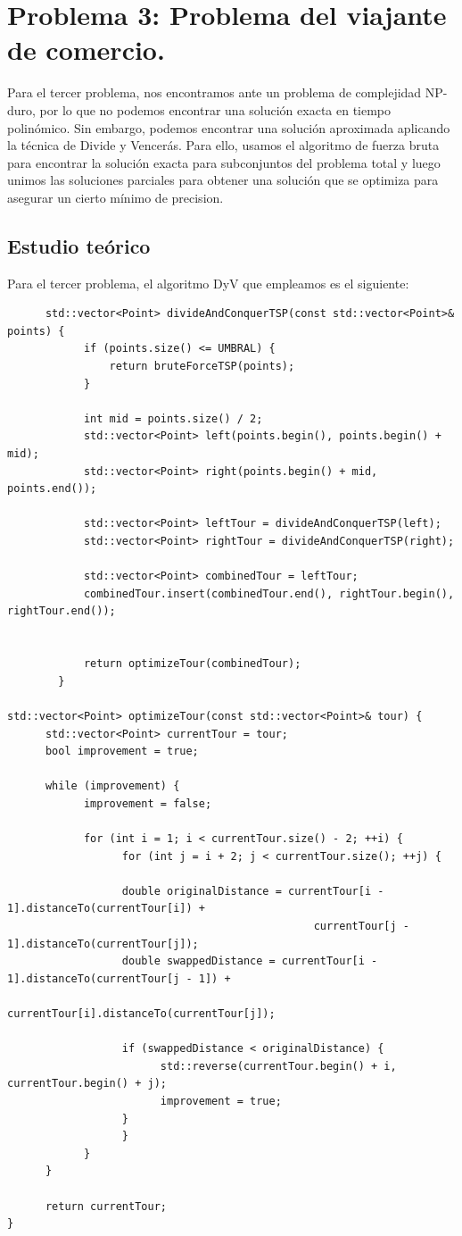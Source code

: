 \documentclass[11pt,openany]{book}
\begin{document}
\section{Problema 3: Problema del viajante de comercio.}
Para el tercer problema, nos encontramos ante un problema de complejidad
NP-duro, por lo que no podemos encontrar una solución exacta en tiempo polinómico.
Sin embargo, podemos encontrar una solución aproximada aplicando la técnica de Divide y Vencerás.
Para ello, usamos el algoritmo de fuerza bruta para encontrar la solución exacta para subconjuntos
del problema total y luego unimos las soluciones parciales para obtener una solución que se optimiza
para asegurar un cierto mínimo de precision.

\subsection{Estudio teórico}
Para el tercer problema, el algoritmo DyV que empleamos es el siguiente:
\begin{lstlisting}
      std::vector<Point> divideAndConquerTSP(const std::vector<Point>& points) {
            if (points.size() <= UMBRAL) {
                return bruteForceTSP(points);
            }
        
            int mid = points.size() / 2;
            std::vector<Point> left(points.begin(), points.begin() + mid);
            std::vector<Point> right(points.begin() + mid, points.end());
        
            std::vector<Point> leftTour = divideAndConquerTSP(left);
            std::vector<Point> rightTour = divideAndConquerTSP(right);
        
            std::vector<Point> combinedTour = leftTour;
            combinedTour.insert(combinedTour.end(), rightTour.begin(), rightTour.end());
        
        
            return optimizeTour(combinedTour);
        }

std::vector<Point> optimizeTour(const std::vector<Point>& tour) {
      std::vector<Point> currentTour = tour;
      bool improvement = true;

      while (improvement) {
            improvement = false;

            for (int i = 1; i < currentTour.size() - 2; ++i) {
                  for (int j = i + 2; j < currentTour.size(); ++j) {

                  double originalDistance = currentTour[i - 1].distanceTo(currentTour[i]) +
                                                currentTour[j - 1].distanceTo(currentTour[j]);
                  double swappedDistance = currentTour[i - 1].distanceTo(currentTour[j - 1]) +
                                          currentTour[i].distanceTo(currentTour[j]);

                  if (swappedDistance < originalDistance) {
                        std::reverse(currentTour.begin() + i, currentTour.begin() + j);
                        improvement = true;
                  }
                  }
            }
      }

      return currentTour;
}
\end{lstlisting}
\end{document}
